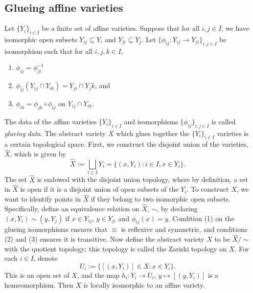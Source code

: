 \documentclass[12pt]{amsart}
\theoremstyle{plain}
\begin{document}
\subsection{Glueing affine varieties}
Let $\{Y_i\}_{i\in I}$ be a finite set of affine varieties.
Suppose that for all $i, j \in I$, we have isomorphic open subsets $Y_{ij} \subseteq Y_i$ and $Y_{ji} \subseteq Y_j$.
Let $\{\phi_{ij} : Y_{ij} \to Y_{ji}\}_{i, j \in I}$ be isomorphism such that for all $i, j, k \in I$,
\begin{enumerate}
\item
$\phi_{ij} = \phi_{ji}^{-1}$

\item
$\phi_{ij}(Y_{ij} \cap Y_{ik}) = Y_{ji} \cap Y_jk$, and

\item
$\phi_{ik} = \phi_{jk} \circ \phi_{ij}$ on $Y_{ij} \cap Y_{ik}$.
\end{enumerate}
The data of the affine varieties $\{Y_i\}_{i\in I}$ and isomorphisms $\{\phi_{ij}\}_{i,j\in I}$ is called \emph{glueing data}.
The abstract variety $X$ which glues together the $\{Y_i\}_{i\in I}$ varieties is a certain topological space.
First, we construct the disjoint union of the varieties, $\hat X$, which is given by
$$\hat X := \bigsqcup_{i \in I} Y_i = \{(x, Y_i) : i \in I, x \in Y_i\}.$$
The set $\hat X$ is endowed with the disjoint union topology, where by definition, a set in $\hat X$ is open if it is a disjoint union of open subsets of the $Y_i$.
To construct $X$, we want to identify points in $\hat X$ if they belong to two isomorphic open subsets.
Specifically, define an equivalence relation on $\hat X$, $\sim$, by declaring $(x, Y_i) \sim (y, Y_j)$ if $x \in Y_{ij}$, $y\in Y_{ji}$ and $\phi_{ij}(x) = y$.
Condition (1) on the glueing isomorphisms ensures that $\equiv$ is reflexive and symmetric, and conditions (2) and (3) ensures it is transitive.
Now define the abstract variety $X$ to be $\hat X / \sim$ with the quotient topology;
this topology is called the Zariski topology on $X$.
For each $i \in I$, denote
$$U_i := \{[(x, Y_i)] \in X : x \in Y_i\}.$$
This is an open set of $X$, and the map $h_i : Y_i \to U_i$, $y \mapsto [(y, Y_i)]$ is a homeomorphism.
Then $X$ is locally isomorphic to an affine variety.
\end{document}
